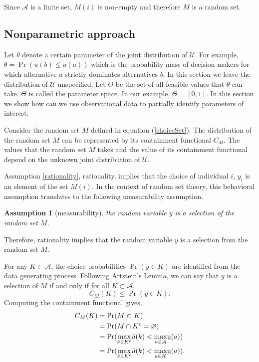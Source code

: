 \documentclass[reqno]{article}
\newtheorem{Assumption}{Assumption}
\begin{document}
Since $\mathcal{A}$ is a finite set, $M(i)$ is non-empty and therefore $M$ is a random set. 


\subsection{Nonparametric approach}\label{nonpar}
Let $\theta $ denote a certain parameter of the joint distribution of $\mathcal{U}$. For example, $\theta =\Pr\left( \bar{u}(b) \leq \underbar{u}(a) \right)$ which is the probability mass of decision makers for which alternative $a$ strictly dominates alternatives $b$. In this section we leave the distribution of $\mathcal{U}$ unspecified. Let $\Theta $ be the set of all feasible values that $\theta $ can take. $\Theta $ is called the parameter space. In our example, $\Theta=[0,1]$. In this section we show how can we use observational data to partially identify parameters of interest.

Consider the random set $M$ defined in equation (\ref{choiceSet}). The distribution of the random set $M$ can be represented by its containment functional $C_M$. The values that the random set $M$ takes and the value of its containment functional depend on the unknown joint distribution of $\mathcal{U}$. 

Assumption \ref{rationality}, rationality, implies that the choice of individual $i$, $y_i$ is an element of the set $M(i)$. In the context of random set theory, this behavioral assumption translates to the following measurability assumption.
\begin{Assumption}[measurability]
the random variable $y$ is a selection of the random set $M$.
\end{Assumption}
Therefore, rationality implies that the random variable $y$ is a selection from the random set $M$. 

For any $K\subset \mathcal{A}$, the choice probabilities $\Pr (y\in K)$ are identified from the data generating process. Following Artstein's Lemma, we can say that $y$ is a selection of $M$ if and only if for all $K\subset \mathcal{A}$, 
\begin{equation}
C_{M}(K)\leq \Pr (y\in K).  \label{containment_inequality}
\end{equation}
Computing the containment functional gives, 
\begin{align*}
C_{M}(K)& =\Pr (M\subset K) \\
& =\Pr (M\cap K^{c}=\varnothing ) \\
& =\Pr (\underset{k\in K^{c}}{\max }\bar{u}(k)<\underset{a\in \mathcal{A}}{\max }%
\text{\b{u}}(a)) \\
& =\Pr (\underset{k\in K^{c}}{\max }\bar{u}(k)<\underset{a\in K}{\max }%
\text{\b{u}}(a))\text{.}
\end{align*}
\end{document}
